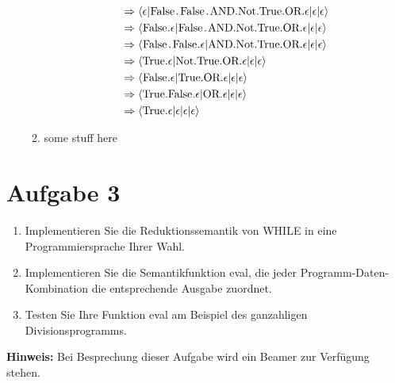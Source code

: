 \documentclass[ngerman,a4paper]{report}
\begin{document}
\begin{enumerate}
\begin{enumerate}
\begin{align*}
&\Rightarrow \langle \epsilon|\text{\lstinline!False.False.AND.Not.True.OR!}.\epsilon|\epsilon|\epsilon\rangle\\
&\Rightarrow \langle \text{\lstinline!False!}.\epsilon|\text{\lstinline!False.AND.Not.True.OR!}.\epsilon|\epsilon|\epsilon\rangle\\
&\Rightarrow \langle \text{\lstinline!False.False!}.\epsilon|\text{\lstinline!AND.Not.True.OR!}.\epsilon|\epsilon|\epsilon\rangle\\
&\Rightarrow \langle \text{\lstinline!True!}.\epsilon|\text{\lstinline!Not.True.OR!}.\epsilon|\epsilon|\epsilon\rangle\\
&\Rightarrow \langle \text{\lstinline!False!}.\epsilon|\text{\lstinline!True.OR!}.\epsilon|\epsilon|\epsilon\rangle\\
&\Rightarrow \langle \text{\lstinline!True.False!}.\epsilon|\text{\lstinline!OR!}.\epsilon|\epsilon|\epsilon\rangle\\
&\Rightarrow \langle \text{\lstinline!True!}.\epsilon|\epsilon|\epsilon|\epsilon\rangle\\
\end{align*}
\item some stuff here\\
\end{enumerate}
\end{enumerate}
\section*{Aufgabe 3 }
\begin{enumerate}
	\item Implementieren Sie die Reduktionssemantik von WHILE in eine Programmiersprache Ihrer Wahl.
	\item Implementieren Sie die Semantikfunktion eval, die jeder Programm-Daten-Kombination die entsprechende Ausgabe zuordnet.
	\item Testen Sie Ihre Funktion eval am Beispiel des ganzahligen Divisionsprogramms.
\end{enumerate}
\textbf{Hinweis:} Bei Besprechung dieser Aufgabe wird ein Beamer zur Verfügung stehen.
\end{document}
